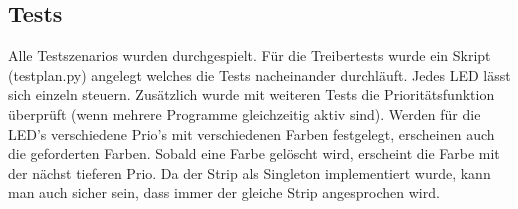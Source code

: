 \documentclass[]{article}
\begin{document}
\subsection{Tests}\label{tests}

Alle Testszenarios wurden durchgespielt. Für die Treibertests wurde ein
Skript (testplan.py) angelegt welches die Tests nacheinander durchläuft.
Jedes LED lässt sich einzeln steuern. Zusätzlich wurde mit weiteren
Tests die Prioritätsfunktion überprüft (wenn mehrere Programme
gleichzeitig aktiv sind). Werden für die LED's verschiedene Prio's mit
verschiedenen Farben festgelegt, erscheinen auch die geforderten Farben.
Sobald eine Farbe gelöscht wird, erscheint die Farbe mit der nächst
tieferen Prio. Da der Strip als Singleton implementiert wurde, kann man
auch sicher sein, dass immer der gleiche Strip angesprochen wird.
\end{document}
